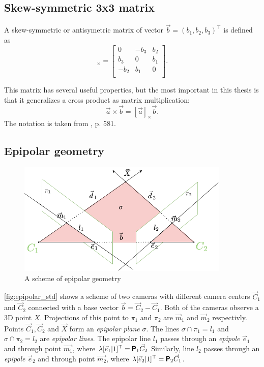 \subsection{Skew-symmetric 3x3 matrix}
A skew-symmetric or antisymetric matrix of vector $\vec{b} = (b_1, b_2, b_3)^\top$ is defined as
\begin{equation}
    [\vec{b}]_{\times} = \begin{bmatrix}
        0 & -b_3 & b_2 \\ 
        b_3 & 0 & b_1 \\ 
        -b_2 & b_1 & 0 \\ 
    \end{bmatrix}.
\end{equation}

This matrix has several useful properties, but the most important in this thesis is that it generalizes a cross product as matrix multiplication:
\begin{equation}
    \vec{a} \times \vec{b} = [\vec{a}]_{\times} \vec{b}.
\end{equation}
The notation is taken from \cite{hartley_zisserman_2004}, p. 581.
\subsection{Epipolar geometry}
\label{sec:epipolar_geometry}
\begin{figure}[h]
    \centering
    \includegraphics[width=0.9\textwidth]{graphics/epipolar.png}
    \caption{A scheme of epipolar geometry}
    \label{fig:epipolar_std}
\end{figure}

\autoref{fig:epipolar_std} shows a scheme of two cameras with different camera centers $\vec{C}_1$ and $\vec{C}_2$ connected with a base vector $\vec{b} = \vec{C}_2 - \vec{C}_1$. 
Both of the cameras observe a 3D point $X$. 
Projections of this point to $\pi_1$ and $\pi_2$ are $\vec{m}_1$ and $\vec{m}_2$ respectivly. 
Points $\vec{C}_1, \vec{C}_2$ and $\vec{X}$ form an \textit{epipolar plane} $\sigma$.
The lines $\sigma \cap \pi_1 = l_1$ and $\sigma \cap \pi_2 = l_2$ are \textit{epipolar lines}. 
The epipolar line $l_1$ passes through an \textit{epipole} $\vec{e}_1$ and through point $\vec{m_1}$, where $\lambda [\vec{e}_1 | 1]^\top = \pmb{\mathsf{P}}_1 \vec{C}_2$
Similarly, line $l_2$ passes through an \textit{epipole} $\vec{e}_2$ and through point $\vec{m_2}$, where $\lambda [\vec{e}_2 | 1]^\top = \pmb{\mathsf{P}}_2 \vec{C}_1$.

